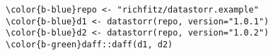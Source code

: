 \documentclass[class=minimal,border=0]{standalone}
\begin{document}
%
\begin{BVerbatim}[bgcolor=b-darkgrey]
\color{b-blue}repo <- "richfitz/datastorr.example"
\color{b-blue}d1 <- datastorr(repo, version="1.0.1")
\color{b-blue}d2 <- datastorr(repo, version="1.0.2")
\color{b-green}daff::daff(d1, d2)
\end{BVerbatim}
\end{document}

